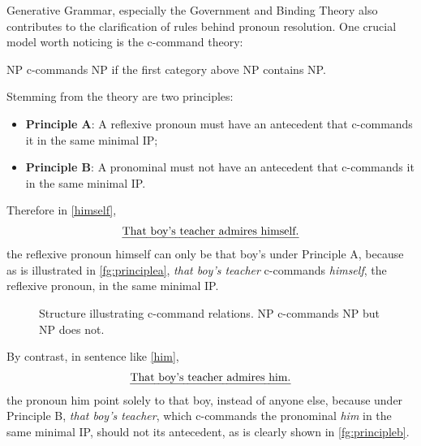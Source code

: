 Generative Grammar, especially the Government and Binding Theory also contributes to the clarification of rules behind pronoun resolution. One crucial model worth noticing is the c-command theory: 
\begin{definition}[C-Command]
	NP c-commands NP if the first category above NP contains NP.
\end{definition}
Stemming from the theory are two principles:
\begin{itemize}
	\item \textbf{Principle A}: A reflexive pronoun must have an antecedent that c-commands it in the same minimal IP;
	\item \textbf{Principle B}: A pronominal must not have an antecedent that c-commands it in the same minimal IP.
\end{itemize}
Therefore in \eqref{himself},
\begin{align}
	\mbox{\emph{That boy's teacher admires himself.}}\label{himself}
\end{align}
the reflexive pronoun himself can only be that boy's under Principle A, because as is illustrated in \autoref{fg:principlea}, \emph{that boy's teacher} c-commands \emph{himself}, the reflexive pronoun, in the same minimal IP.
\begin{figure}[htb]\centering
{}
\caption{Structure illustrating c-command relations. NP c-commands NP but NP does not.}\label{fg:principlea}
\end{figure}

By contrast, in sentence like \eqref{him},
\begin{align}
	\mbox{\emph{That boy's teacher admires him.}}\label{him}
\end{align}
the pronoun him point solely to that boy, instead of anyone else, because under Principle B, \emph{that boy's teacher}, which c-commands the pronominal \emph{him} in the same minimal IP, should not its antecedent, as is clearly shown in \autoref{fg:principleb}.

